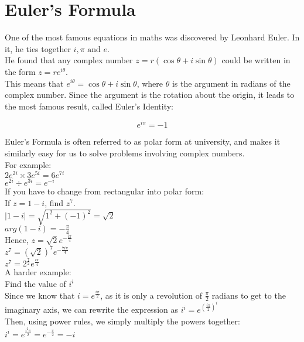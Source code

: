 \documentclass[../main.tex]{subfiles}
\begin{document}
\section{Euler's Formula}
One of the most famous equations in maths was discovered by Leonhard Euler. In it, he ties together \(i,\pi \text{ and } e\).\\

He found that any complex number \(z=r(\cos{\theta}+i\sin{\theta})\) could be written in the form \(z=re^{i\theta}\).\\

This means that \(e^{i\theta}=\cos{\theta}+i\sin{\theta}\), where \(\theta\) is the argument in radians of the complex number. Since the argument is the rotation about the origin, it leads to the most famous result, called Euler's Identity:

\[e^{i\pi}=-1\]

Euler's Formula is often referred to as polar form at university, and makes it similarly easy for us to solve problems involving complex numbers.\\

For example:\\
\(2e^{2i} \times 3e^{5i}=6e^{7i}\)\\

\(e^{2i} \div e^{3i}=e^{-i}\)\\

If you have to change from rectangular into polar form:\\
If \(z=1-i\), find \(z^7\).\\

\(|1-i|=\sqrt{1^2+(-1)^2}=\sqrt{2}\)\\
\(arg(1-i)=-\frac{\pi}{4}\)\\
Hence, \(z=\sqrt{2}e^{-\frac{i\pi }{4}}\)\\
\(z^7=(\sqrt{2})^7 e^{-\frac{7i\pi}{4}}\)\\
\(z^7=2^{\frac{7}{2}}e^{\frac{i\pi}{4}}\)\\

A harder example:\\
Find the value of \(i^i\)\\

Since we know that \(i=e^{\frac{i\pi}{2}}\), as it is only a revolution of \(\frac{\pi}{2}\) radians to get to the imaginary axis, we can rewrite the expression as \(i^i=e^{(\frac{i\pi}{2})^{i}}\)\\
Then, using power rules, we simply multiply the powers together:\\
\(i^i=e^{\frac{i^2\pi}{2}}=e^{-\frac{\pi}{2}}=-i\)\\
\end{document}
